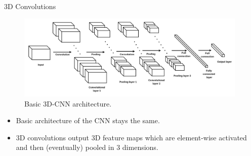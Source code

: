 \begin{vbframe}{3D Convolutions}
    \begin{figure}
        \centering
        \includegraphics[width=11cm]{plots/05_conv_variations/3d/3dconv_arch.png}
        \caption{Basic 3D-CNN architecture.}
    \end{figure}
    \begin{itemize}
        \item Basic architecture of the CNN stays the same.
        \item 3D convolutions output 3D feature maps which are element-wise activated and then (eventually) pooled in 3 dimensions.
    \end{itemize}
\end{vbframe}

